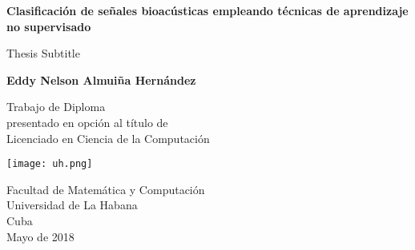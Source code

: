\begin{titlepage}
    \begin{center}
        \vspace*{1cm}

        \Huge
        \textbf{Clasificación de señales bioacústicas empleando técnicas de aprendizaje no supervisado}

        \vspace{0.5cm}
        \LARGE
        Thesis Subtitle

        \vspace{1.5cm}

        \textbf{Eddy Nelson Almuiña Hernández}

        \vfill

        Trabajo de Diploma\\
        presentado en opción al título de\\
        Licenciado en Ciencia de la Computación\\

        \vspace{0.8cm}

        \texttt{[image: uh.png]}

        \Large
        Facultad de Matemática y Computación\\
        Universidad de La Habana\\
        Cuba\\
        Mayo de 2018
    \end{center}
\end{titlepage}